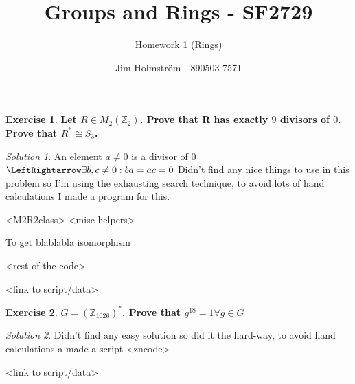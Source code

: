 \documentclass[a4paper,twoside=false,abstract=false,numbers=noenddot,
titlepage=false,headings=small,parskip=half,version=last]{scrartcl}
\author{Jim Holmström - 890503-7571}
\title{Groups and Rings - SF2729}
\subtitle{Homework 1 (Rings)}
\theoremstyle{definition}
\newtheorem{exercise}{Exercise}
\theoremstyle{remark}
\newtheorem*{solution}{Solution}
\newcommand{\ZZ}{\ensuremath{\mathbb{Z}}}
\begin{document}
\maketitle
\thispagestyle{empty}

\begin{exercise}
{\bf
Let $R \in M_2(\ZZ_2)$. Prove that R has exactly $9$ divisors of $0$. Prove
that $R^* \cong S_3$.
}
\end{exercise}
\begin{solution}
An element $a \neq 0$ is a divisor of 0 $\LeftRightarrow \exists b,c \neq 0 : ba=ac=0$
Didn't find any nice things to use in this problem so I'm using the exhausting
search technique, to avoid lots of hand calculations I made a program for this.

<M2R2class>
<misc helpers>

To get blablabla isomorphism

<rest of the code>

<link to script/data>
\end{solution}

\begin{exercise}
{\bf
$G=(\ZZ_{1026})^*$. Prove that $g^{18}=1 \forall g \in G$
}
\end{exercise}
\begin{solution}

Didn't find any easy solution so did it the hard-way, to avoid hand
calculations a made a script
<zncode>

<link to script/data>
\end{solution}

\end{document}
